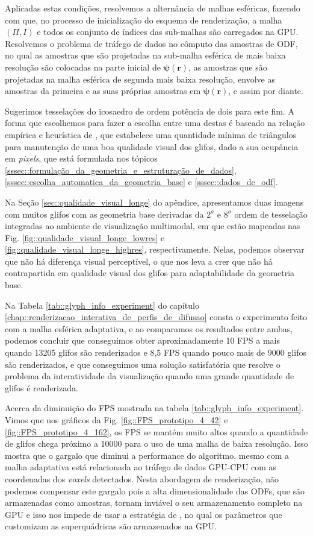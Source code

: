 \documentclass[
    12pt,                %
    oneside,            %
    a4paper,            %
    english,            %
    french,                %
    spanish,            %
    brazil                %
    ]{abntex2}
\begin{document}
Aplicadas estas condições, resolvemos a alternância de malhas esféricas, fazendo com que, no processo de inicialização do esquema de renderização, a malha $(\Pi, I)$ e todos os conjunto de índices das sub-malhas são carregados na GPU. Resolvemos o problema de tráfego de dados no cômputo das amostras de ODF, no qual as amostras que são projetadas na sub-malha esférica de mais baixa resolução são colocadas na parte inicial de $\boldsymbol{\psi(\mathbf{r})}$, as amostras que são projetadas na malha esférica de segunda mais baixa resolução, envolve as amostras da primeira e as suas próprias amostras em $\boldsymbol{\psi(\mathbf{r})}$, e assim por diante.

Sugerimos tesselações do icosaedro de ordem potência de dois para este fim. A forma que escolhemos para fazer a escolha entre uma destas é baseado na relação empírica e heurística de , que estabelece uma quantidade mínima de triângulos para manutenção de uma boa qualidade visual dos glifos, dado a sua ocupância em \textit{pixels}, que está formulada nos tópicos \ref{sssec::formulação_da_geometria_e_estruturação_de_dados}, \ref{sssec::escolha_automatica_da_geometria_base} e \ref{sssec::dados_de_odf}.

Na Seção \ref{sec::qualidade_visual_longe} do apêndice, apresentamos duas imagens com muitos glifos com as geometria base derivadas da $2^a$ e $8^a$ ordem de tesselação integradas ao ambiente de visualização multimodal, em que estão mapeadas nas Fig. \ref{fig::qualidade_visual_longe_lowres} e \ref{fig::qualidade_visual_longe_highres}, respectivamente. Nelas, podemos observar que não há diferença visual perceptível, o que nos leva a crer que não há contrapartida em qualidade visual dos glifos para adaptabilidade da geometria base.

Na Tabela \ref{tab::glyph_info_experiment} do capítulo \ref{chap::renderizacao_interativa_de_perfis_de_difusao} consta o experimento feito com a malha esférica adaptativa, e ao comparamos os resultados entre ambas, podemos concluir que conseguimos obter aproximadamente 10 FPS a mais quando 13205 glifos são renderizados e 8,5 FPS quando pouco mais de 9000 glifos são renderizados, e que conseguimos uma solução satisfatória que resolve o problema da interatividade da visualização quando uma grande quantidade de glifos é renderizada.

Acerca da diminuição do FPS mostrada na tabela \ref{tab::glyph_info_experiment}. Vimos que nos gráficos da Fig. \ref{fig::FPS_prototipo_4_42} e \ref{fig::FPS_prototipo_4_162}, os FPS se mantém muito altos quando a quantidade de glifos chega próximo a 10000 para o uso de uma malha de baixa resolução. Isso mostra que o gargalo que diminui a performance do algoritmo, mesmo com a malha adaptativa está relacionada ao tráfego de dados GPU-CPU com as coordenadas dos \textit{voxels} detectados. Nesta abordagem de renderização, não podemos compensar este gargalo pois a alta dimensionalidade das ODFs, que são armazenadas como amostras, tornam inviável o seu armazenamento completo na GPU e isso nos impede de usar a estratégia de , no qual os parâmetros que customizam as superquádricas são armazenados na GPU.
\end{document}
